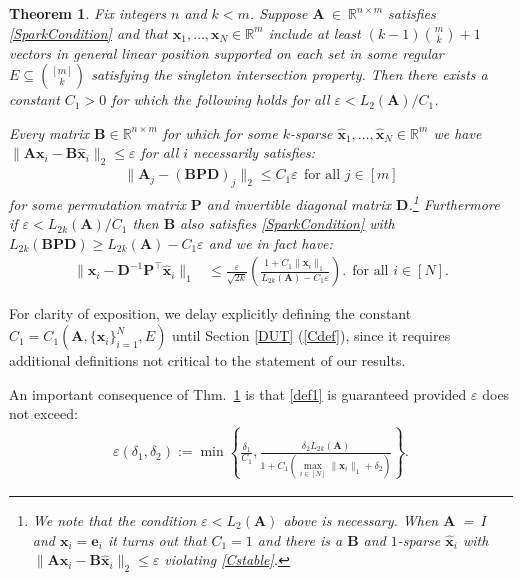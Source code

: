 \documentclass[9pt,twocolumn]{pnas-new}
\newtheorem{theorem}{Theorem}
\begin{document}
\begin{theorem}\label{DeterministicUniquenessTheorem}
Fix integers $n$ and $k < m$. Suppose $\mathbf{A}~\in~\mathbb{R}^{n \times m}$ satisfies \eqref{SparkCondition} and that \mbox{$\mathbf{x}_1, \ldots, \mathbf{x}_N \in \mathbb{R}^m$} include at least \mbox{$(k-1){m \choose k}+1$} vectors in general linear position supported on each set in some regular $E \subseteq {[m] \choose k}$ satisfying the singleton intersection property. Then there exists a constant $C_1 > 0$ for which the following holds for all $\varepsilon < L_2(\mathbf{A}) / C_1$. %

Every matrix $\mathbf{B} \in \mathbb{R}^{n \times m}$ for which for some $k$-sparse $\mathbf{\hat x}_1, \ldots, \mathbf{\hat x}_N \in \mathbb{R}^{m}$ we have \mbox{$\|\mathbf{A}\mathbf{x}_i - \mathbf{B}\mathbf{\hat x}_i\|_2 \leq \varepsilon$} for all $i$ necessarily satisfies:
\begin{align}\label{Cstable}
\|\mathbf{A}_j-(\mathbf{B}\mathbf{PD})_j\|_2 \leq C_1 \varepsilon \ \ \text{for all $j \in [m]$}
\end{align}
%
for some permutation matrix $\mathbf{P}$ and invertible diagonal matrix $\mathbf{D}$.\footnote{We note that the condition $\varepsilon < L_2(\mathbf{A})$ above is necessary. When \mbox{$\mathbf{A}$ = $I$} and $\mathbf{x}_i = \mathbf{e}_i$ it turns out that $C_1 = 1$ and there is a $\mathbf{B}$ and $1$-sparse $\mathbf{\hat x}_i$ with $\|\mathbf{A}\mathbf{x}_i - \mathbf{B}\mathbf{\hat x}_i\|_2 \leq \varepsilon$ violating \eqref{Cstable}.}
Furthermore if $\varepsilon < L_{2k}(\mathbf{A}) / C_1$ then $\mathbf{B}$ also satisfies \eqref{SparkCondition} with $L_{2k}(\mathbf{B}\mathbf{PD}) \geq L_{2k}(\mathbf{A}) - C_1 \varepsilon$ and we in fact have:
\begin{align}\label{b-PDa}
\|\mathbf{x}_i - \mathbf{D}^{-1}\mathbf{P}^{\top}\mathbf{\hat x}_i\|_1 &\leq \frac{\varepsilon}{\sqrt{2k}} \left( \frac{ 1+C_1 \|\mathbf{x}_i\|_1 }{ L_{2k}(\mathbf{A}) -  C_1\varepsilon } \right).
 \ \ \text{for all $i \in [N]$}.
\end{align}
\end{theorem}

For clarity of exposition, we delay explicitly defining the constant $C_1 = C_1(\mathbf{A}, \{\mathbf{x}_i\}_{i=1}^N, E)$ until Section \ref{DUT} (\eqref{Cdef}), since it requires additional definitions not critical to the statement of our results.

An important consequence of Thm.~\ref{DeterministicUniquenessTheorem} is that \eqref{def1} is guaranteed provided $\varepsilon$ does not exceed:
\begin{align}\label{epsdel}
\varepsilon(\delta_1, \delta_2) := \min \left\{ \frac{\delta_1}{ C_1 }, \frac{ \delta_2 L_{2k}(\mathbf{A})}{ 1 + C_1 \left( \max_{i \in [N]} \|\mathbf{x}_i\|_1  + \delta_2 \right) } \right\}.
\end{align}
\end{document}
